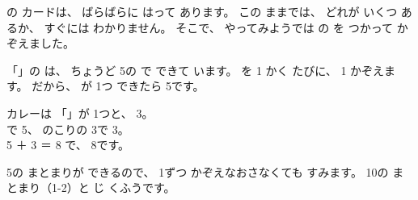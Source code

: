 
\clearpage


\label{bk:1-17:hyou}\bkhatenaref の カードは、 ばらばらに はって あります。
この ままでは、 どれが いくつ あるか、 すぐには わかりません。
そこで、 やってみようでは の を つかって かぞえました。

\par\vspace{2pt}

\noindent\begin{minipage}[c]{0.36\linewidth}\centering
{}
\end{minipage}\hfill
\begin{minipage}[c]{0.62\linewidth}
「」の は、 ちょうど 5の で できて います。
を 1 かく たびに、 1 かぞえます。
だから、 が 1つ できたら 5です。
\end{minipage}

\par\vspace{4pt}
\noindent\begin{minipage}[c]{0.36\linewidth}\centering
{}
\end{minipage}\hfill
\begin{minipage}[c]{0.62\linewidth}
カレーは 「」が 1つと、 3。\\
で 5、 のこりの 3で 3。\\
5 ＋ 3 ＝ 8 で、 8です。
\end{minipage}

\par\vspace{4pt}
\noindent 5の まとまりが できるので、 1ずつ かぞえなおさなくても すみます。
10の まとまり（1-2）と じ くふうです。

